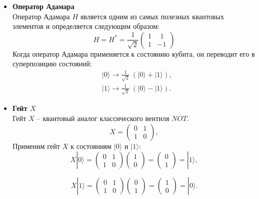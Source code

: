 \documentclass[12pt,a4paper]{article}
\begin{document}
	\begin{itemize}
		\item \textbf{Оператор Адамара} \\
		Оператор Адамара $H$ является одним из самых полезных квантовых элементов и определяется следующим образом:
		\begin{equation}
			H = H^{*} = \frac{1}{\sqrt{2}}
			\begin{pmatrix}
				1 &  ~~1 \\
				1 & -1
			\end{pmatrix}
		\end{equation}
		Когда оператор Адамара применяется к состоянию кубита, он переводит его в суперпозицию состояний:
		\begin{equation}
			\begin{split}
				& | 0 \rangle \rightarrow \frac{1}{\sqrt{2}}~(| 0 \rangle + | 1 \rangle), \\
				& | 1 \rangle \rightarrow \frac{1}{\sqrt{2}}~(| 0 \rangle- | 1 \rangle).
			\end{split}
		\end{equation}
		\item \textbf{Гейт $X$} \\
		Гейт $X$ -- квантовый аналог классического вентиля $NOT$.
		\begin{equation}
			X = 
			\begin{pmatrix}
				0 & 1 \\
				1 & 0
			\end{pmatrix},
		\end{equation}
		Применим гейт $X$ к состояниям $|0 \rangle$ и $|1 \rangle$:
		\begin{equation}
			X |0 \rangle = 
			\begin{pmatrix}
				0 & 1 \\
				1 & 0
			\end{pmatrix}
			\begin{pmatrix}
				1 \\
				0
			\end{pmatrix}
			=
			\begin{pmatrix}
				0 \\
				1
			\end{pmatrix}
			=  |1 \rangle,
		\end{equation}
		
		\begin{equation}
			X |1 \rangle = 
			\begin{pmatrix}
				0 & 1 \\
				1 & 0
			\end{pmatrix}
			\begin{pmatrix}
				0 \\
				1
			\end{pmatrix}
			=
			\begin{pmatrix}
				1 \\
				0
			\end{pmatrix}
			=  |0 \rangle.
		\end{equation}
		

\end{itemize}
\end{document}
